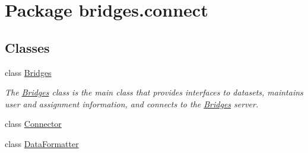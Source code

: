 \hypertarget{namespacebridges_1_1connect}{}\section{Package bridges.\+connect}
\label{namespacebridges_1_1connect}
\subsection*{Classes}
\begin{DoxyCompactItemize}
\item 
class \hyperlink{classbridges_1_1connect_1_1_bridges}{Bridges}
\begin{DoxyCompactList}\small\item\em The \hyperlink{classbridges_1_1connect_1_1_bridges}{Bridges} class is the main class that provides interfaces to datasets, maintains user and assignment information, and connects to the \hyperlink{classbridges_1_1connect_1_1_bridges}{Bridges} server. \end{DoxyCompactList}\item 
class \hyperlink{classbridges_1_1connect_1_1_connector}{Connector}
\item 
class \hyperlink{classbridges_1_1connect_1_1_data_formatter}{Data\+Formatter}
\end{DoxyCompactItemize}
